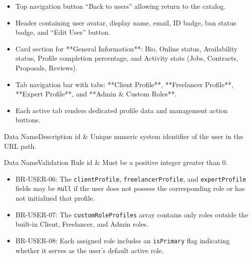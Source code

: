 \begin{itemize}[leftmargin=1.6em,topsep=3pt,itemsep=2pt,parsep=0pt,label=$\bullet$]
    \item Top navigation button ``Back to users'' allowing return to the catalog.
    \item Header containing user avatar, display name, email, ID badge, ban status badge, and ``Edit User'' button.
    \item Card section for **General Information**: Bio, Online status, Availability status, Profile completion percentage, and Activity stats (Jobs, Contracts, Proposals, Reviews).
    \item Tab navigation bar with tabs: **Client Profile**, **Freelancer Profile**, **Expert Profile**, and **Admin \& Custom Roles**.
    \item Each active tab renders dedicated profile data and management action buttons.
\end{itemize}


\begin{specdatatable}{Data Name}{Description}
id & Unique numeric system identifier of the user in the URL path.\\ \hline
\end{specdatatable}

\begin{specdatatable}{Data Name}{Validation Rule}
id & Must be a positive integer greater than 0.\\ \hline
\end{specdatatable}

\begin{itemize}[leftmargin=1.6em,topsep=3pt,itemsep=2pt,parsep=0pt,label=$\bullet$]\brrulelist
    \item BR-USER-06: The \texttt{clientProfile}, \texttt{freelancerProfile}, and \texttt{expertProfile} fields may be \texttt{null} if the user does not possess the corresponding role or has not initialized that profile.
    \item BR-USER-07: The \texttt{customRoleProfiles} array contains only roles outside the built-in Client, Freelancer, and Admin roles.
    \item BR-USER-08: Each assigned role includes an \texttt{isPrimary} flag indicating whether it serves as the user's default active role.
\end{itemize}

